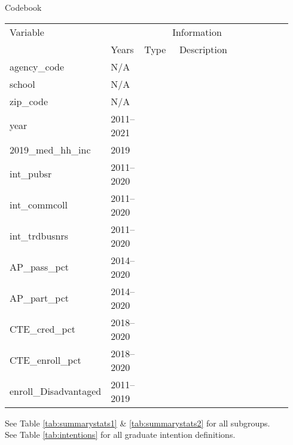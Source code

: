 \begin{threeparttable}
    \caption{Codebook} %
\label{tab:codebook} %
    \begin{tabular}{ p{0.2\linewidth} p{0.115\linewidth} p{0.13\linewidth} p{0.49\linewidth}}     %
    \toprule %
    Variable                        & \multicolumn{3}{c}{Information} \\ %

                       \cmidrule(r){2-4} %
                                    &   Years    &    Type     &  Description \\ 
\midrule
agency\_code                         &   N/A            &         &                \\ 
school                               &   N/A            &         &                \\ 
zip\_code                            &   N/A            &         &                \\ 
year                                 &   2011--2021      &         &                \\ 
2019\_med\_hh\_inc                   &   2019           &         &                \\ 
int\_pubsr                           &   2011--2020      &         &               \\                                  
int\_commcoll                        &   2011--2020            &         &                \\ 
int\_trdbusnrs                       &   2011--2020            &         &                \\ 
AP\_pass\_pct                        &   2014--2020         &         &                \\ 
AP\_part\_pct                        &   2014--2020            &         &                \\ 
CTE\_cred\_pct                       &   2018--2020           &         &                \\ 
CTE\_enroll\_pct                     &   2018--2020            &         &                \\ 
enroll\_Disadvantaged                &   2011--2019            &         &                \\ 
\midrule
\end{tabular}
\begin{tablenotes}
    {\small

        See Table \ref{tab:summarystats1} \& \ref{tab:summarystats2} for all subgroups.\\
        See Table \ref{tab:intentions} for all graduate intention definitions.
     }
\end{tablenotes}
\end{threeparttable}